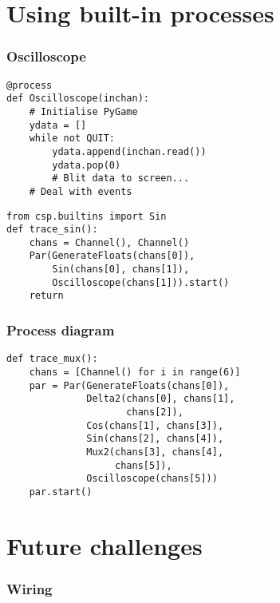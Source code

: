 \documentclass{beamer}
\begin{document}
\section{Using built-in processes}

\frame
{
  \frametitle{Oscilloscope}
}

\begin{frame}[fragile]
\begin{lstlisting}[language=python_new]
@process
def Oscilloscope(inchan):
    # Initialise PyGame
    ydata = []
    while not QUIT:
        ydata.append(inchan.read())
        ydata.pop(0)
        # Blit data to screen...
    # Deal with events
\end{lstlisting}
\end{frame}

\begin{frame}[fragile]
\begin{lstlisting}[language=python_new]
from csp.builtins import Sin
def trace_sin():
    chans = Channel(), Channel()
    Par(GenerateFloats(chans[0]),
        Sin(chans[0], chans[1]), 
        Oscilloscope(chans[1])).start()
    return    
\end{lstlisting}
\end{frame}


\frame
{
  \frametitle{Process diagram}
}



\begin{frame}[fragile]
\begin{lstlisting}[language=python_new]
def trace_mux():
    chans = [Channel() for i in range(6)]
    par = Par(GenerateFloats(chans[0]),
              Delta2(chans[0], chans[1], 
                     chans[2]),
              Cos(chans[1], chans[3]),
              Sin(chans[2], chans[4]),
              Mux2(chans[3], chans[4], 
                   chans[5]),
              Oscilloscope(chans[5]))
    par.start()
\end{lstlisting}
\end{frame}


\section{Future challenges}

\frame
{
  \frametitle{Wiring}
}
\end{document}
